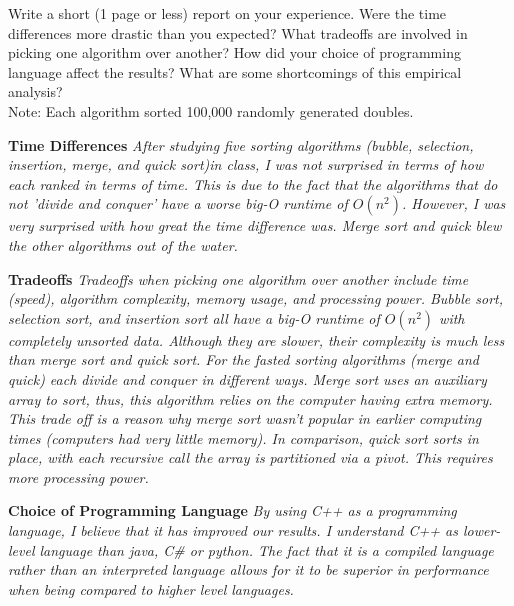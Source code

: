 Write a short (1 page or less) report on your experience. Were the time differences more
drastic than you expected? What tradeoffs are involved in picking one algorithm over
another? How did your choice of programming language affect the results? What are
some shortcomings of this empirical analysis?  \\

Note: Each algorithm sorted 100,000 randomly generated doubles. \

\begin{tcolorbox}
\textbf{
    Time Differences
}
\textit{
After studying five sorting algorithms (bubble, selection, insertion, merge, and quick sort)in class, I was not surprised in terms of how each ranked in terms of time. This is due to the fact that the algorithms that do not 'divide and conquer' have a worse big-O runtime of \(O(n^2)\). However, I was very surprised with how great the time difference was. Merge sort and quick blew the other algorithms out of the water.
}
\end{tcolorbox}

\begin{tcolorbox}
\textbf{
    Tradeoffs
}
\textit{
Tradeoffs when picking one algorithm over another include time (speed), algorithm complexity, memory usage, and processing power. Bubble sort, selection sort, and insertion sort all have a big-O runtime of \(O(n^2)\) with completely unsorted data. Although they are slower, their complexity is much less than merge sort and quick sort. For the fasted sorting algorithms (merge and quick) each divide and conquer in different ways. Merge sort uses an auxiliary array to sort, thus, this algorithm relies on the computer having extra memory. This trade off is a reason why merge sort wasn't popular in earlier computing times (computers had very little memory). In comparison, quick sort sorts in place, with each recursive call the array is partitioned via a pivot. This requires more processing power.
}
\end{tcolorbox}

\begin{tcolorbox}
\textbf{
    Choice of Programming Language
}
\textit{
By using C++ as a programming language, I believe that it has improved our results. I understand C++ as lower-level language than java, C\# or python. The fact that it is a compiled language rather than an interpreted language allows for it to be superior in performance when being compared to higher level languages.
}
\end{tcolorbox}

